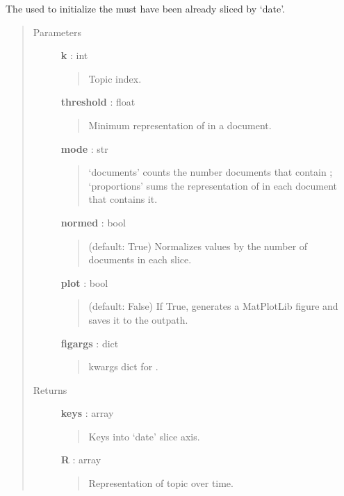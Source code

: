 \documentclass[letterpaper,10pt,english]{sphinxmanual}
\begin{document}
\begin{fulllineitems}
\begin{fulllineitems}
The {\hyperref[tethne.classes.corpus:tethne.classes.corpus.Corpus]{}} used to initialize the 
must have been already sliced by `date'.
\begin{quote}\begin{description}
\item[{Parameters}] \leavevmode
\textbf{k} : int
\begin{quote}

Topic index.
\end{quote}

\textbf{threshold} : float
\begin{quote}

Minimum representation of  in a document.
\end{quote}

\textbf{mode} : str
\begin{quote}

`documents' counts the number documents that contain ;
`proportions' sums the representation of  in each document
that contains it.
\end{quote}

\textbf{normed} : bool
\begin{quote}

(default: True) Normalizes values by the number of documents in each
slice.
\end{quote}

\textbf{plot} : bool
\begin{quote}

(default: False) If True, generates a MatPlotLib figure and saves
it to the {\hyperref[tethne.model.managers.mallet:tethne.model.managers.mallet.MALLETModelManager]{}} outpath.
\end{quote}

\textbf{figargs} : dict
\begin{quote}

kwargs dict for .
\end{quote}

\item[{Returns}] \leavevmode
\textbf{keys} : array
\begin{quote}

Keys into `date' slice axis.
\end{quote}

\textbf{R} : array
\begin{quote}

Representation of topic  over time.
\end{quote}


\end{description}
\end{quote}
\end{fulllineitems}
\end{fulllineitems}
\end{document}

